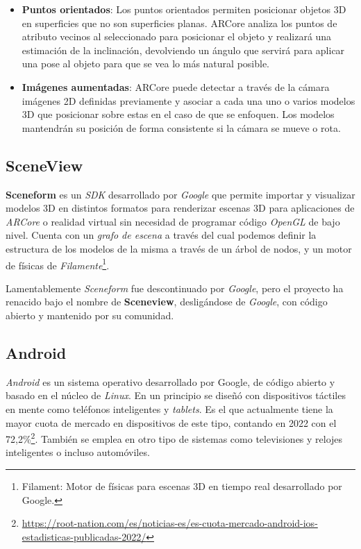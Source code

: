 \begin{itemize}
    \item \textbf{Puntos orientados}: Los puntos orientados permiten posicionar objetos 3D en superficies que no son superficies planas. ARCore analiza los puntos de atributo vecinos al seleccionado para posicionar el objeto y realizará una estimación de la inclinación, devolviendo un ángulo que servirá para aplicar una pose al objeto para que se vea lo más natural posible.

    \item \textbf{Imágenes aumentadas}: ARCore puede detectar a través de la cámara imágenes 2D definidas previamente y asociar a cada una uno o varios modelos 3D que posicionar sobre estas en el caso de que se enfoquen. Los modelos mantendrán su posición de forma consistente si la cámara se mueve o rota.

\end{itemize}

\subsection{SceneView}

\textbf{Sceneform} es un \textit{SDK} desarrollado por \textit{Google} que permite importar y visualizar modelos 3D en distintos formatos para renderizar escenas 3D para aplicaciones de \textit{ARCore} o realidad virtual sin necesidad de programar código \textit{OpenGL} de bajo nivel. Cuenta con un \textit{grafo de escena} a través del cual podemos definir la estructura de los modelos de la misma a través de un árbol de nodos, y un motor de físicas de \textit{Filamente}\footnote{Filament: Motor de físicas para escenas 3D en tiempo real desarrollado por Google.}.

Lamentablemente \textit{Sceneform} fue descontinuado por \textit{Google}, pero el proyecto ha renacido bajo el nombre de \textbf{Sceneview}\cite{sceneview}, desligándose de \textit{Google}, con código abierto y mantenido por su comunidad.

\subsection{Android}

\textit{Android} es un sistema operativo desarrollado por Google, de código abierto y basado en el núcleo de \textit{Linux}. En un principio se diseñó con dispositivos táctiles en mente como teléfonos inteligentes y \textit{tablets}. Es el que actualmente tiene la mayor cuota de mercado en dispositivos de este tipo, contando en 2022 con el 72,2\%\footnote{\url{https://root-nation.com/es/noticias-es/es-cuota-mercado-android-ios-estadisticas-publicadas-2022/}}. También se emplea en otro tipo de sistemas como televisiones y relojes inteligentes o incluso automóviles.

